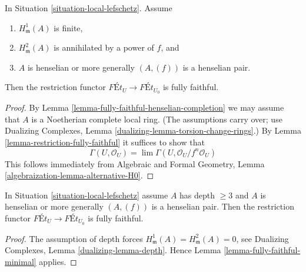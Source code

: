 \begin{lemma}
\label{lemma-fully-faithful-minimal}
\begin{reference}
\cite[Corollary 1.11]{Bhatt-local}
\end{reference}
In Situation \ref{situation-local-lefschetz}. Assume
\begin{enumerate}
\item $H^1_\mathfrak m(A)$ is finite,
\item $H^2_\mathfrak m(A)$ is annihilated by a power of $f$, and
\item $A$ is henselian or more generally $(A, (f))$ is a henselian pair.
\end{enumerate}
Then the restriction functor
$\textit{F\'Et}_U \longrightarrow \textit{F\'Et}_{U_0}$
is fully faithful.
\end{lemma}

\begin{proof}
By Lemma \ref{lemma-fully-faithful-henselian-completion}
we may assume that $A$ is a Noetherian complete local ring.
(The assumptions carry over; use
Dualizing Complexes, Lemma \ref{dualizing-lemma-torsion-change-rings}.)
By Lemma \ref{lemma-restriction-fully-faithful}
it suffices to show that
$$
\Gamma(U, \mathcal{O}_U) = \lim \Gamma(U, \mathcal{O}_U/f^n\mathcal{O}_U)
$$
This follows immediately from
Algebraic and Formal Geometry, Lemma \ref{algebraization-lemma-alternative-H0}.
\end{proof}

\begin{lemma}
\label{lemma-fully-faithful}
In Situation \ref{situation-local-lefschetz} assume $A$ has depth $\geq 3$
and $A$ is henselian or more generally $(A, (f))$ is a henselian pair. Then
the restriction functor
$\textit{F\'Et}_U \to \textit{F\'Et}_{U_0}$
is fully faithful.
\end{lemma}

\begin{proof}
The assumption of depth forces
$H^1_\mathfrak m(A) = H^2_\mathfrak m(A) = 0$, see
Dualizing Complexes, Lemma \ref{dualizing-lemma-depth}.
Hence Lemma \ref{lemma-fully-faithful-minimal} applies.
\end{proof}



























